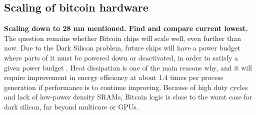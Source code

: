 





\subsection{Scaling of bitcoin hardware}
\textbf{Scaling down to 28 nm mentioned. Find and compare current lowest.}
The question remains whether Bitcoin chips will scale well, even further than now.
Due to the Dark Silicon problem, future chips will have a power budget where parts of it must be powered down or deactivated, in order to satisfy a given power budget \cite{shmac-plan}. 
Heat dissipation is one of the main reasons why, and it will require improvement in energy efficiency at about 1.4 times per process generation if performance is to continue improving.
Because of high duty cycles and lack of low-power density SRAMs, Bitcoin logic is close to the worst case for dark silicon, far beyond multicore or GPUs.

